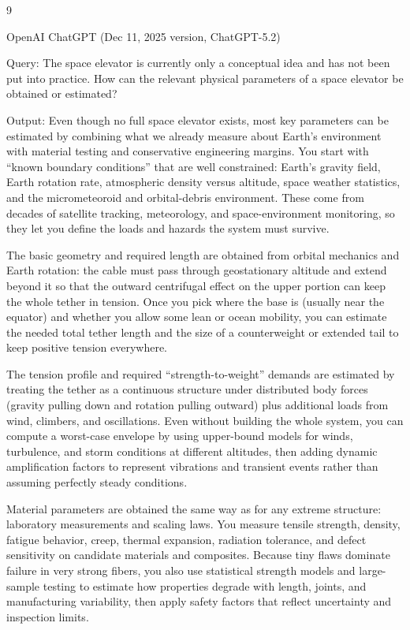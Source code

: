 \documentclass{mcmthesis}
\begin{document}
\begin{ReportAiUse}{9}

OpenAI ChatGPT (Dec 11, 2025 version, ChatGPT-5.2) 

Query: The space elevator is currently only a conceptual idea and has not been put into practice. How can the relevant physical parameters of a space elevator be obtained or estimated?

Output: Even though no full space elevator exists, most key parameters can be estimated by combining what we already measure about Earth’s environment with material testing and conservative engineering margins. You start with “known boundary conditions” that are well constrained: Earth’s gravity field, Earth rotation rate, atmospheric density versus altitude, space weather statistics, and the micrometeoroid and orbital-debris environment. These come from decades of satellite tracking, meteorology, and space-environment monitoring, so they let you define the loads and hazards the system must survive.

The basic geometry and required length are obtained from orbital mechanics and Earth rotation: the cable must pass through geostationary altitude and extend beyond it so that the outward centrifugal effect on the upper portion can keep the whole tether in tension. Once you pick where the base is (usually near the equator) and whether you allow some lean or ocean mobility, you can estimate the needed total tether length and the size of a counterweight or extended tail to keep positive tension everywhere.

The tension profile and required “strength-to-weight” demands are estimated by treating the tether as a continuous structure under distributed body forces (gravity pulling down and rotation pulling outward) plus additional loads from wind, climbers, and oscillations. Even without building the whole system, you can compute a worst-case envelope by using upper-bound models for winds, turbulence, and storm conditions at different altitudes, then adding dynamic amplification factors to represent vibrations and transient events rather than assuming perfectly steady conditions.

Material parameters are obtained the same way as for any extreme structure: laboratory measurements and scaling laws. You measure tensile strength, density, fatigue behavior, creep, thermal expansion, radiation tolerance, and defect sensitivity on candidate materials and composites. Because tiny flaws dominate failure in very strong fibers, you also use statistical strength models and large-sample testing to estimate how properties degrade with length, joints, and manufacturing variability, then apply safety factors that reflect uncertainty and inspection limits.


\end{ReportAiUse}
\end{document}

